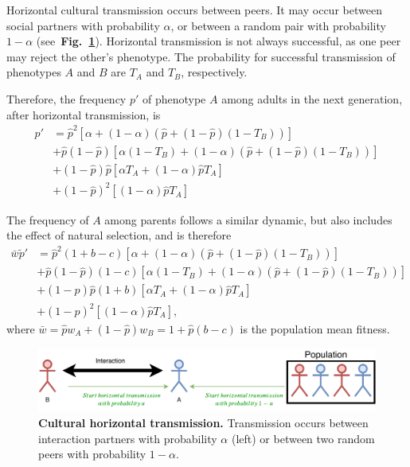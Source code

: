 \documentclass[12pt]{extarticle}
\begin{document}
Horizontal cultural transmission occurs between peers. 
It may occur between social partners with probability $\alpha$, or between a random pair with probability $1-\alpha$ (see~\textbf{Fig.~\ref{fig:horizontal}}).
Horizontal transmission is not always successful, as one peer may reject the other's phenotype. The probability for successful transmission of phenotypes $A$ and $B$ are $T_A$ and $T_B$, respectively.

Therefore, the frequency $p'$ of phenotype $A$ among adults in the next generation, after horizontal transmission, is 
\begin{equation}\label{eq:nextgen_adults}
\begin{aligned}
p'
& = \hat{p}^2 [\alpha + (1-\alpha)(\hat{p} + (1-\hat{p})(1-T_B))] \\
& + \hat{p}(1-\hat{p}) [\alpha(1-T_B) + (1-\alpha)(\hat{p} + (1-\hat{p})(1-T_B))] \\
& + (1-\hat{p})\hat{p} [\alpha T_A + (1-\alpha) \hat{p} T_A ] \\
& + (1-\hat{p})^2 [(1-\alpha) \hat{p} T_A]
\end{aligned}
\end{equation}

The frequency of $A$ among parents follows a similar dynamic, but also includes the effect of natural selection, and is therefore
\begin{equation}\label{eq:nextgen_parents}
\begin{aligned}
\bar{w} \tilde{p}'
& = \hat{p}^2 (1+b-c) [\alpha + (1-\alpha)(\hat{p} + (1-\hat{p})(1-T_B))] \\
& + \hat{p}(1-\hat{p}) (1-c) [\alpha(1-T_B) + (1-\alpha)(\hat{p} + (1-\hat{p})(1-T_B))] \\
& + (1-\hat{p})\hat{p} (1+b) [\alpha T_A + (1-\alpha) \hat{p} T_A ] \\
& + (1-\hat{p})^2 [(1-\alpha) \hat{p} T_A],
\end{aligned}
\end{equation}
where $\bar{w} = \hat{p} w_A + (1-\hat{p}) w_B = 1 + \hat{p}(b-c)$ is the population mean fitness.

\begin{figure}[b]
  \centering
  \includegraphics[scale=1]{figure.pdf}
  \caption{\textbf{Cultural horizontal transmission.} Transmission occurs between interaction partners with probability $\alpha$ (left) or between two random peers with probability $1-\alpha$.}
  \label{fig:horizontal}
\end{figure}
\end{document}
